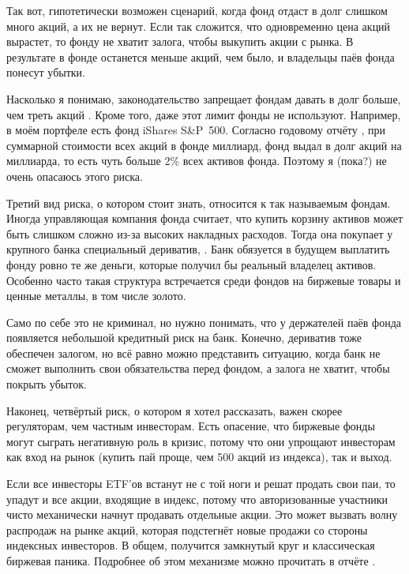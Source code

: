 Так вот, гипотетически возможен сценарий, когда фонд отдаст в долг слишком много 
акций, а их не вернут. Если так сложится, что одновременно цена акций вырастет, 
то фонду не хватит залога, чтобы выкупить акции с рынка. В результате в фонде 
останется меньше акций, чем было, и владельцы паёв фонда понесут убытки.

Насколько я понимаю, законодательство запрещает фондам давать в долг больше, 
чем треть акций \cite{wsj2011lending}. Кроме того, даже этот лимит фонды не 
используют. Например, в моём портфеле есть фонд iShares S\&P~500. Согласно 
годовому отчёту \cite{ishares2020report}, при суммарной стоимости всех акций в 
фонде  миллиард, фонд выдал в долг акций на  
миллиарда, то есть чуть больше 2\% всех активов фонда. Поэтому я (пока?) не 
очень опасаюсь этого риска.

Третий вид риска, о котором стоит знать, относится к так называемым 
 фондам. Иногда управляющая компания фонда 
считает, что купить корзину активов может быть слишком сложно из-за высоких 
накладных расходов. Тогда она покупает у крупного банка специальный дериватив, 
. Банк обязуется в будущем 
выплатить фонду ровно те же деньги, которые получил бы реальный владелец активов. 
Особенно часто такая структура встречается среди фондов на биржевые товары и 
ценные металлы, в том числе золото.

Само по себе это не криминал, но нужно понимать, что у держателей паёв фонда 
появляется небольшой кредитный риск на банк. Конечно, дериватив тоже обеспечен 
залогом, но всё равно можно представить ситуацию, когда банк не сможет выполнить 
свои обязательства перед фондом, а залога не хватит, чтобы покрыть убыток.

Наконец, четвёртый риск, о котором я хотел рассказать, важен скорее регуляторам, 
чем частным инвесторам. Есть опасение, что биржевые фонды могут сыграть 
негативную роль в кризис, потому что они упрощают инвесторам как вход на рынок 
(купить пай проще, чем 500 акций из индекса), так и выход.

Если все инвесторы ETF'ов встанут не с той ноги и решат продать свои паи, то 
упадут и все акции, входящие в индекс, потому что авторизованные участники чисто 
механически начнут продавать отдельные акции. Это может вызвать волну распродаж 
на рынке акций, которая подстегнёт новые продажи со стороны индексных 
инвесторов. В общем, получится замкнутый круг и классическая биржевая паника. 
Подробнее об этом механизме можно прочитать в отчёте \cite{pagano2019can}.

